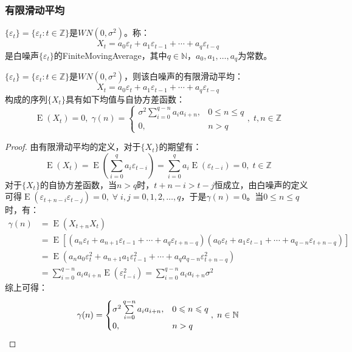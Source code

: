 \subsubsection{有限滑动平均}
\begin{definition}
	$\{\varepsilon_t\}=\{\varepsilon_t:t\in\mathbb{Z}\}$是$WN(0,\sigma^2)$。称：
	\begin{equation*}
		X_t=a_0\varepsilon_t+a_1\varepsilon_{t-1}+\cdots+a_q\varepsilon_{t-q}
	\end{equation*}
	是白噪声$\{\varepsilon_t\}$的\gls{FiniteMovingAverage}，其中$q\in\mathbb{N}$，$a_0,a_1,\dots,a_q$为常数。
\end{definition}
\begin{theorem}\label{theo:ECovFiniteMovingAverage}
	$\{\varepsilon_t\}=\{\varepsilon_t:t\in\mathbb{Z}\}$是$WN(0,\sigma^2)$，则该白噪声的有限滑动平均：
	\begin{equation*}
		X_t=a_0\varepsilon_t+a_1\varepsilon_{t-1}+\cdots+a_q\varepsilon_{t-q}
	\end{equation*}
	构成的序列$\{X_t\}$具有如下均值与自协方差函数：
	\begin{equation*}
		\operatorname{E}(X_t)=0,\;
		\gamma(n)=
		\begin{cases}
			\sigma^2\sum\limits_{i=0}^{q-n}a_ia_{i+n}, & 0\leqslant n\leqslant q \\
			0, & n>q
		\end{cases},\;t,n\in\mathbb{Z}
	\end{equation*}
\end{theorem}
\begin{proof}
	由有限滑动平均的定义，对于$\{X_t\}$的期望有：
	\begin{equation*}
		\operatorname{E}(X_t)=\operatorname{E}\left(\sum_{i=0}^{q}a_i\varepsilon_{t-i}\right)=\sum_{i=0}^{q}a_i\operatorname{E}(\varepsilon_{t-i})=0,\;t\in\mathbb{Z}
	\end{equation*}
	对于$\{X_t\}$的自协方差函数，当$n>q$时，$t+n-i>t-j$恒成立，由白噪声的定义可得$\operatorname{E}(\varepsilon_{t+n-i}\varepsilon_{t-j})=0,\;\forall\;i,j=0,1,2,\dots,q$，于是$\gamma(n)=0$。当$0\leqslant n\leqslant q$时，有：
	\begin{align*}
		\gamma(n)
		&=\operatorname{E}(X_{t+n}X_t) \\
		&=\operatorname{E}[(a_{n}\varepsilon_{t}+a_{n+1}\varepsilon_{t-1}+\cdots+a_{q}\varepsilon_{t+n-q})(a_0\varepsilon_t+a_1\varepsilon_{t-1}+\cdots+a_{q-n}\varepsilon_{t+n-q})] \\
		&=\operatorname{E}(a_na_0\varepsilon_t^2+a_{n+1}a_1\varepsilon_{t-1}^2+\cdots+a_qa_{q-n}\varepsilon_{t+n-q}^2) \\
		&=\sum_{i=0}^{q-n}a_ia_{i+n}\operatorname{E}(\varepsilon_{t-i}^2)
		=\sum_{i=0}^{q-n}a_ia_{i+n}\sigma^2
	\end{align*}
	综上可得：
	\begin{equation*}
		\gamma(n)=
		\begin{cases}
			\sigma^2\sum\limits_{i=0}^{q-n}a_ia_{i+n}, & 0\leqslant n\leqslant q \\
			0, & n>q
		\end{cases},\;n\in\mathbb{N}\qedhere
	\end{equation*}
\end{proof}
